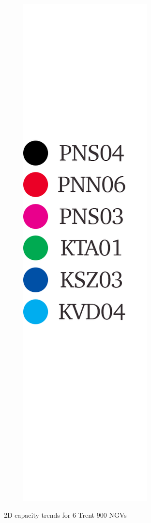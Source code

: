 \documentclass[a4paper, 11pt, oneside]{report}
\begin{document}
\begin{figure}[H]
\begin{subfigure}{.1125\textwidth}
		\includegraphics[width=\linewidth]{figs/t900_2d_capacity_trends_legend.png}
	\end{subfigure}
	\caption{2D capacity trends for 6 Trent 900 NGVs}
	\label{fig:t900_2d_capacity_trends}
\end{figure}
\end{document}
